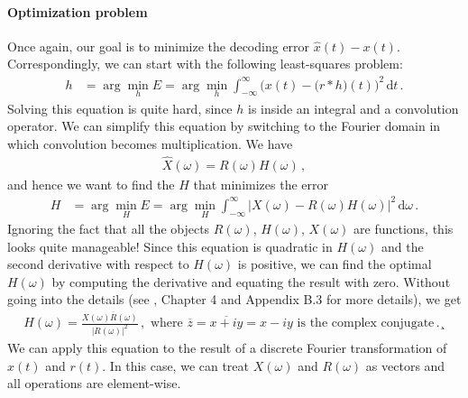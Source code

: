 \documentclass[10pt,letterpaper,oneside]{article}
\begin{document}
\paragraph{Optimization problem}
Once again, our goal is to minimize the decoding error $\hat x(t) - x(t)$. Correspondingly, we can start with the following least-squares problem:
\begin{align*}
	h &= \arg\min_{h} E = \arg\min_{h} \int_{-\infty}^\infty \Big( x(t) - \big(r \ast h\big)(t) \Big)^2 \,\mathrm{d}t \,.
\end{align*}
Solving this equation is quite hard, since $h$ is inside an integral and a convolution operator. We can simplify this equation by switching to the Fourier domain in which convolution becomes multiplication. We have
\begin{align*}
	\hat{X}(\omega) = R(\omega)H(\omega) \,,
\end{align*}
and hence we want to find the $H$ that minimizes the error
\begin{align*}
	H &= \arg\min_{H} E = \arg\min_{H} \int_{-\infty}^{\infty} \big| X(\omega) - R(\omega) H(\omega) \big|^2 \,\mathrm{d}\omega \,.
\end{align*}
Ignoring the fact that all the objects $R(\omega)$, $H(\omega)$, $X(\omega)$ are functions, this looks quite manageable! Since this equation is quadratic in $H(\omega)$ and the second derivative with respect to $H(\omega)$ is positive, we can find the optimal $H(\omega)$ by computing the derivative and equating the result with zero. Without going into the details (see \cite{eliasmith2003neural}, Chapter 4 and Appendix B.3 for more details), we get
\begin{align*}
		H(\omega) = \frac{X(\omega) \overline{R}(\omega)}{|R(\omega)|^2} \,, \text{ where } \overline{z} = \overline{x + iy} = x - iy \text{ is the complex conjugate} \,.¸
\end{align*}
We can apply this equation to the result of a discrete Fourier transformation of $x(t)$ and $r(t)$. In this case, we can treat $X(\omega)$ and $R(\omega)$ as vectors and all operations are element-wise.
\end{document}

